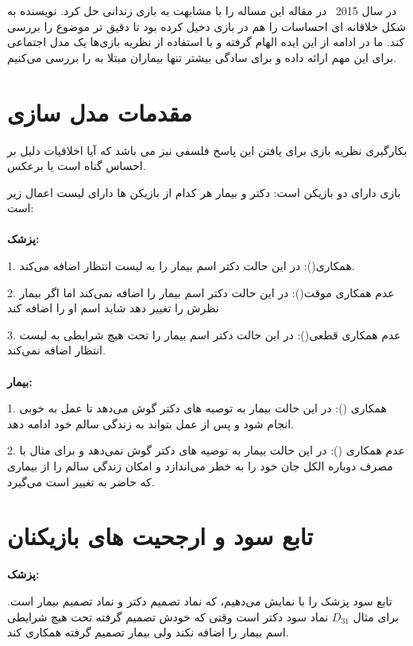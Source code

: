 \documentclass[12pt]{article}
\begin{document}
در سال 2015 \ در مقاله  این مساله را با مشابهت به بازی زندانی حل کرد. نویسنده به شکل خلاقانه ای
احساسات را هم در بازی دخیل کرده بود تا دقیق تر موضوع را بررسی کند. ما 
در ادامه از این
ایده الهام گرفته و با استفاده از نظریه بازی‌ها یک مدل اجتماعی برای این مهم
ارائه داده و برای سادگی بیشتر تنها بیماران مبتلا به   را بررسی می‌کنیم.
\\
\section{مقدمات مدل سازی}

بکارگیری نظریه بازی برای یافتن این پاسخ فلسفی نیز می باشد که آیا اخلاقیات دلیل بر احساس گناه است یا برعکس.

بازی دارای دو بازیکن است: دکتر و بیمار
هر کدام از بازیکن ها دارای لیست اعمال زیر است:
\\
\\
\textbf{پزشک:}

1. همکاری(): در این حالت دکتر اسم بیمار را به لیست انتظار اضافه می‌کند.

2. عدم همکاری موقت(): در این حالت دکتر اسم بیمار را اضافه نمی‌کند اما اگر بیمار نظرش را تغییر دهد شاید اسم او را اضافه کند

3. عدم همکاری قطعی(): در این حالت دکتر اسم بیمار را تحت هیچ شرایطی به لیست انتظار اضافه نمی‌کند.
\\
\\
\textbf{بیمار:}

1. همکاری (): در این حالت بیمار به توصیه های دکتر گوش می‌دهد تا عمل به خوبی انجام شود و پس از عمل بتواند به زندگی سالم خود ادامه دهد.

2. عدم همکاری (): در این حالت بیمار به توصیه های دکتر گوش نمی‌دهد و برای مثال با مصرف دوباره الکل جان خود را به خطر می‌اندازد و امکان زندگی سالم را از بیماری که حاضر به تغییر است می‌گیرد.
\\
\section{تابع سود و ارجحیت های بازیکنان}

\textbf{پزشک:}

تابع سود پزشک را با  نمایش می‌دهیم، که  نماد تصمیم دکتر و  نماد تصمیم بیمار است. برای مثال $D_{31}$ نماد سود دکتر است وقتی که خودش تصمیم گرفته تحت هیچ شرایطی اسم بیمار را اضافه نکند ولی بیمار تصمیم گرفته همکاری کند.\\
\end{document}
